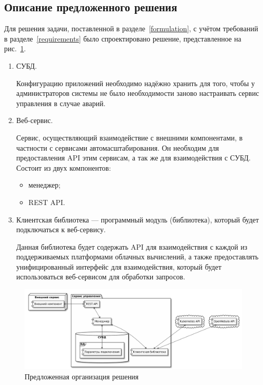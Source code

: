 \subsection{Описание предложенного решения}
Для решения задачи, поставленной в разделе~\ref{formulation}, с учётом требований в разделе~\ref{requirements} было спроектировано решение, представленное на рис.~\ref{approach-organization}.
\begin{enumerate}
    \item СУБД.
    
    Конфигурацию приложений необходимо надёжно хранить для того, чтобы у администраторов системы не было необходимости заново настраивать сервис управления в случае аварий.
    
    \item Веб-сервис.
    
    Сервис, осуществляющий взаимодействие с внешними компонентами, в частности с сервисами автомасштабирования. 
    Он необходим для предоставления API этим сервисам, а так же для взаимодействия с СУБД.
    Состоит из двух компонентов: 
    \begin{itemize}
        \item менеджер;
        \item REST API.
    \end{itemize}
    \item Клиентская библиотека --- программный модуль (библиотека), который будет подключаться к веб-сервису.
    
    Данная библиотека будет содержать API для взаимодействия с каждой из поддерживаемых платформами облачных вычислений, а также предоставлять унифицированный интерфейс для взаимодействия, который будет использоваться веб-сервисом для обработки запросов.
\end{enumerate}

\begin{figure}[hbtp]
    \centering
    \includegraphics[width=\textwidth]{img/approach-organization.pdf}
    \caption{Предложенная организация решения}
    \label{approach-organization}
\end{figure}

